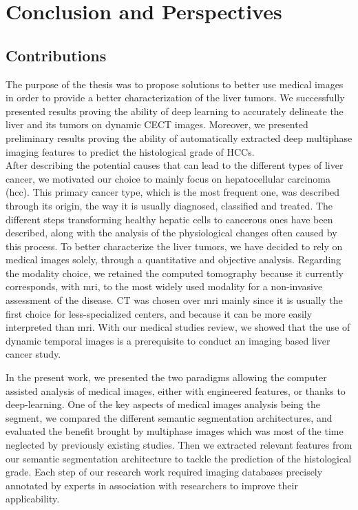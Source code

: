 \chapter{Conclusion and Perspectives}\label{conclusion}

\section{Contributions}

The purpose of the thesis was to propose solutions to better use medical images in order to provide a better characterization of the liver tumors. We successfully presented results proving the ability of deep learning to accurately delineate the liver and its tumors on dynamic CECT images. Moreover, we presented preliminary results proving the ability of automatically extracted deep multiphase imaging features to predict the histological grade of HCCs.\\
After describing the potential causes that can lead to the different
types of liver cancer, we motivated our choice to mainly focus on
hepatocellular carcinoma (\ac{hcc}).
This primary cancer type, which is the most frequent one, was described
through its origin, the way it is usually diagnosed, classified and
treated.
The different steps transforming healthy hepatic cells to cancerous ones
have been described, along with the analysis of the physiological
changes often caused by this process.
To better characterize the liver tumors, we have decided to rely on
medical images solely, through a quantitative and objective analysis.
Regarding the modality choice, we retained the computed tomography
because it currently corresponds, with \ac{mri}, to the most widely used modality 
for a non-invasive assessment of the disease.
CT was chosen over \ac{mri} mainly since it is usually the first choice for
less-specialized centers, and because it can be more easily interpreted
than \ac{mri}. With our medical studies review, we showed that the use of
dynamic temporal images is a prerequisite to conduct an imaging based liver cancer
study.

In the present work, we presented the two paradigms allowing the computer
assisted analysis of medical images, either with engineered features, or
thanks to deep-learning. One of the key aspects of medical images
analysis being the segment, we compared the different semantic
segmentation architectures, and evaluated the benefit brought by
multiphase images which was most of the time neglected by previously
existing studies. Then we extracted relevant features from our semantic
segmentation architecture to tackle the prediction of the histological
grade. Each step of our research work required imaging databases
precisely annotated by experts in association with researchers to
improve their applicability.

